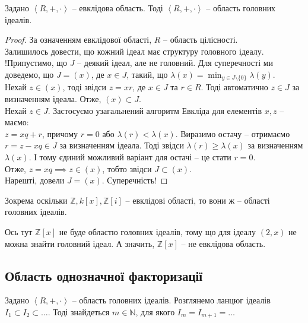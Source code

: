 \documentclass{math_library}
\begin{document}
\begin{theorem}
Задано $\left<R,+,\cdot\right>$ -- евклідова область. Тоді $\left<R,+,\cdot\right>$ -- область головних ідеалів.
\end{theorem}

\begin{proof}
За означенням евклідової області, $R$ -- область цілісності.\\
Залишилось довести, що кожний ідеал має структуру головного ідеалу.\\
!Припустимо, що $J$ -- деякий ідеал, але не головний. Для суперечності ми доведемо, що $J = (x)$, де $x \in J$, такий, що $\lambda(x) = \displaystyle\min_{y \in J \setminus \{0\}} \lambda(y)$.\\
Нехай $z \in (x)$, тоді звідси $z = xr$, де $x \in J$ та $r \in R$. Тоді автоматично $z \in J$ за визначенням ідеала. Отже, $(x) \subset J$.\\
Нехай $z \in J$. Застосуємо узагальнений алгоритм Евкліда для елементів $x,z$ -- маємо:\\
$z = xq + r$, причому $r = 0$ або $\lambda(r) < \lambda(x)$. Виразимо остачу -- отримаємо\\
$r = z - xq \in J$ за визначенням ідеала. Тоді звідси $\lambda(r) \geq \lambda(x)$ за визначенням $\lambda(x)$. І тому єдиний можливий варіант для остачі -- це стати $r = 0$.\\
Отже, $z = xq \implies z \in (x)$, тобто звідси $J \subset (x)$.\\
Нарешті, довели $J = (x)$. Суперечність!
\end{proof}

\begin{example}
Зокрема оскільки $\mathbb{Z}, k[x], \mathbb{Z}[i]$ -- евклідові області, то вони ж -- області головних ідеалів.
\end{example}

\begin{example}
Ось тут $\mathbb{Z}[x]$ не буде областю головних ідеалів, тому що для ідеалу $(2,x)$ не можна знайти головний ідеал. А значить, $\mathbb{Z}[x]$ -- не евклідова область.
\end{example}

\subsection{Область однозначної факторизації}
\begin{lemma}
Задано $\left< R,+,\cdot\right>$ -- область головних ідеалів. Розглянемо ланцюг ідеалів $I_1 \subset I_2 \subset \dots$. Тоді знайдеться $m \in \mathbb{N}$, для якого $I_m = I_{m+1} = \dots$
\end{lemma}
\end{document}
